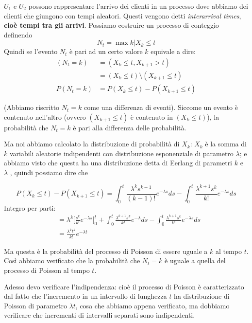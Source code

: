 \documentclass[a4paper,12pt]{book}
\begin{document}
$ U_1 $ e $ U_2 $ possono rappresentare l'arrivo dei clienti in un processo dove abbiamo dei clienti che giungono con tempi aleatori. Questi vengono detti \textit{interarrival times}, \textbf{cioè tempi tra gli arrivi}. 
Possiamo costruire un processo di conteggio definendo 
$$ N_t = \max{k | X_k \le t} $$
Quindi se l'evento $ N_t $ è pari ad un certo valore $ k $ equivale a dire:
\begin{align}
	(N_t = k) & = (X_k \le t, X_{k+1} > t) \\
	& = (X_k \le t) \setminus (X_{k+1} \le t) \\
	P(N_t = k)	& = P(X_k \le t)- P(X_{k+1} \le t)
\end{align}

(Abbiamo riscritto $ N_t = k$ come una differenza di eventi). Siccome un evento è contenuto nell'altro (ovvero $ (X_{k+1} \le t) $ è contenuto in $ (X_k \le t) $), la probabilità che $ N_t = k $ è pari alla differenza delle probabilità.

Ma noi abbiamo calcolato la distribuzione di probabilità di $ X_k $: $ X_k $ è la somma di $ k $ variabili aleatorie indipendenti con distribuzione esponenziale di parametro $\lambda$; e abbiamo visto che questa ha una distribuzione detta di Eerlang di parametri $ k $ e $ \lambda $ , quindi possiamo dire che

$$ P(X_k \le t) - P (X_{k+1} \le t) = \int_{0}^{t} \frac{\lambda^k s^{k-1}}{(k-1)!} e^{-\lambda s} ds - \int_{0}^{t} \frac{\lambda^{k+1} s^{k}}{k!} e^{- \lambda s} ds $$
Integro per parti:
\begin{align*}
	& = \lambda^k \bigg[\frac{s^k}{k!} e^{-\lambda s}\bigg]_0^{t} + \int_{0}^{t} \frac{\lambda^{k+1} s^{k}}{k!} e^{- \lambda} ds - \int_{0}^{t} \frac{\lambda^{k+1} s^{k}}{k!} e^{- \lambda s} ds \\
	& = \frac{\lambda^k t^k}{k!} e^{-\lambda t}
\end{align*}

Ma questa è la probabilità del processo di Poisson di essere uguale a $ k $ al tempo $ t $. Così abbiamo verificato che la probabilità che $ N_t = k $ è uguale a quella del processo di Poisson al tempo $ t $.

Adesso devo verificare l'indipendenza: cioè il processo di Poisson è caratterizzato dal fatto che l'incremento in un intervallo di lunghezza $ t $ ha distribuzione di Poisson di parametro $\lambda t$, cosa che abbiamo appena verificato, ma dobbiamo verificare che incrementi di intervalli separati sono indipendenti.
\end{document}
